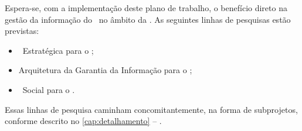 
Espera-se, com a implementação deste plano de trabalho, o benefício direto na gestão da informação do \PEB\ no âmbito da \siglacntrt. As seguintes linhas de pesquisas estão previstas:

\begin{itemize}
    \item \AI\ Estratégica para o \PEB;
    
    \item Arquitetura da Garantia da Informação para o \PEB;
    
    \item \AI\ Social para o \PEB.
\end{itemize}

Essas linhas de pesquisa caminham concomitantemente, na forma de subprojetos, conforme descrito no \autoref{cap:detalhamento} -- .
